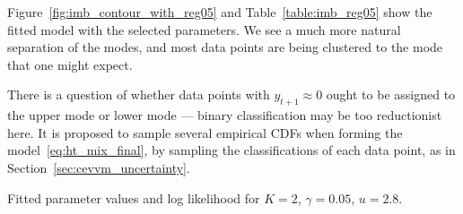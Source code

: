 \documentclass[11pt,twoside,openany]{book}
\numberwithin{Theorem}{chapter}
\numberwithin{Definition}{chapter}
\numberwithin{Lemma}{chapter}
\numberwithin{Algorithm}{chapter}
\numberwithin{equation}{chapter}
\begin{document}
Figure~\ref{fig:imb_contour_with_reg05} and Table~\ref{table:imb_reg05} show
the fitted model with the selected parameters. We see a much more natural separation
of the modes, and most data points are being clustered to the mode that one might expect.

There is a question of whether data points with $y_{t+1} \approx 0$ ought to be
assigned to the upper mode or lower mode --- binary classification may be too
reductionist here. It is proposed to sample several empirical CDFs when forming
the model~\eqref{eq:ht_mix_final}, by sampling the classifications of each data
point, as in Section~\ref{sec:cevvm_uncertainty}.







\begin{table}[htp] \centering
   \caption{Fitted parameter values and log
  likelihood for $K=2$, $\gamma=0.05$, $u=2.8$.\label{table:imb_reg05}}
\end{table}

\end{document}
